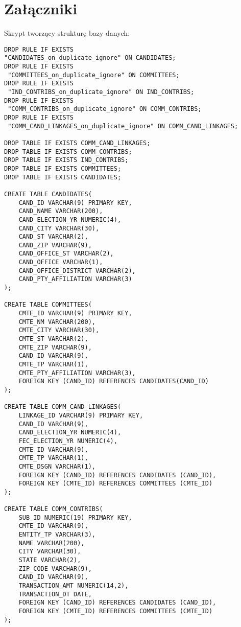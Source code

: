 \documentclass[10pt,a4paper]{article}
\begin{document}
\bigskip \noindent
\bigskip \noindent
\bigskip \noindent

\section{Załączniki}
Skrypt tworzący strukturę bazy danych:
\begin{lstlisting}[style=BashInputStyle]
DROP RULE IF EXISTS 
"CANDIDATES_on_duplicate_ignore" ON CANDIDATES;
DROP RULE IF EXISTS
 "COMMITTEES_on_duplicate_ignore" ON COMMITTEES;
DROP RULE IF EXISTS
 "IND_CONTRIBS_on_duplicate_ignore" ON IND_CONTRIBS;
DROP RULE IF EXISTS
 "COMM_CONTRIBS_on_duplicate_ignore" ON COMM_CONTRIBS;
DROP RULE IF EXISTS
 "COMM_CAND_LINKAGES_on_duplicate_ignore" ON COMM_CAND_LINKAGES;

DROP TABLE IF EXISTS COMM_CAND_LINKAGES;
DROP TABLE IF EXISTS COMM_CONTRIBS;
DROP TABLE IF EXISTS IND_CONTRIBS;
DROP TABLE IF EXISTS COMMITTEES;
DROP TABLE IF EXISTS CANDIDATES;

CREATE TABLE CANDIDATES(
    CAND_ID VARCHAR(9) PRIMARY KEY,
    CAND_NAME VARCHAR(200),
    CAND_ELECTION_YR NUMERIC(4),
    CAND_CITY VARCHAR(30),
    CAND_ST VARCHAR(2),
    CAND_ZIP VARCHAR(9),
    CAND_OFFICE_ST VARCHAR(2),
    CAND_OFFICE VARCHAR(1),
    CAND_OFFICE_DISTRICT VARCHAR(2),
    CAND_PTY_AFFILIATION VARCHAR(3)
);

CREATE TABLE COMMITTEES(
    CMTE_ID VARCHAR(9) PRIMARY KEY,
    CMTE_NM VARCHAR(200),
    CMTE_CITY VARCHAR(30),
    CMTE_ST VARCHAR(2),
    CMTE_ZIP VARCHAR(9),
    CAND_ID VARCHAR(9),
    CMTE_TP VARCHAR(1),
    CMTE_PTY_AFFILIATION VARCHAR(3),
    FOREIGN KEY (CAND_ID) REFERENCES CANDIDATES(CAND_ID)
);

CREATE TABLE COMM_CAND_LINKAGES(
    LINKAGE_ID VARCHAR(9) PRIMARY KEY,
    CAND_ID VARCHAR(9),
    CAND_ELECTION_YR NUMERIC(4),
    FEC_ELECTION_YR NUMERIC(4),
    CMTE_ID VARCHAR(9),
    CMTE_TP VARCHAR(1),
    CMTE_DSGN VARCHAR(1),
    FOREIGN KEY (CAND_ID) REFERENCES CANDIDATES (CAND_ID),
    FOREIGN KEY (CMTE_ID) REFERENCES COMMITTEES (CMTE_ID)
);

CREATE TABLE COMM_CONTRIBS(
    SUB_ID NUMERIC(19) PRIMARY KEY,
    CMTE_ID VARCHAR(9),
    ENTITY_TP VARCHAR(3),
    NAME VARCHAR(200),
    CITY VARCHAR(30),
    STATE VARCHAR(2),
    ZIP_CODE VARCHAR(9),
    CAND_ID VARCHAR(9),
    TRANSACTION_AMT NUMERIC(14,2),
    TRANSACTION_DT DATE,
    FOREIGN KEY (CAND_ID) REFERENCES CANDIDATES (CAND_ID),
    FOREIGN KEY (CMTE_ID) REFERENCES COMMITTEES (CMTE_ID)
);


\end{lstlisting}
\end{document}
